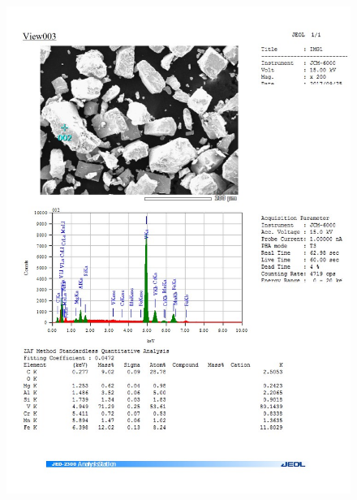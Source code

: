 \documentclass[14pt]{extarticle}
\begin{document}
\begin{figure}[H]
	\includegraphics[width = \linewidth]{./pictures/dot_spec_2.jpg}
\end{figure}
\end{document}
